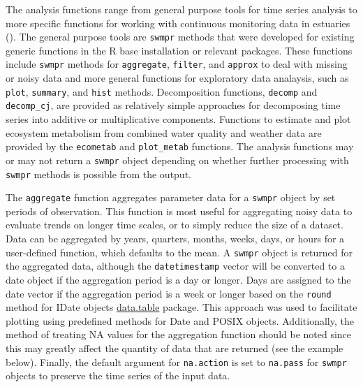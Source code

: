 \documentclass[10pt,letterpaper]{article}\usepackage[]{graphicx}\usepackage[]{color}
\begin{document}
The analysis functions range from general purpose tools for time series analysis to more specific functions for working with continuous monitoring data in estuaries ().  The general purpose tools are \texttt{swmpr} methods that were developed for existing generic functions in the R base installation or relevant packages.  These functions include \texttt{swmpr} methods for \texttt{aggregate}, \texttt{filter}, and \texttt{approx} to deal with missing or noisy data and more general functions for exploratory data analaysis, such as \texttt{plot}, \texttt{summary}, and \texttt{hist} methods.  Decomposition functions, \texttt{decomp} and \texttt{decomp\_cj}, are provided as relatively simple approaches for decomposing time series into additive or multiplicative components. Functions to estimate and plot ecosystem metabolism from combined water quality and weather data are provided by the \texttt{ecometab} and \texttt{plot\_metab} functions.  The analysis functions may or may not return a \texttt{swmpr} object depending on whether further processing with \texttt{swmpr} methods is possible from the output.    

The \texttt{aggregate} function aggregates parameter data for a \texttt{swmpr} object by set periods of observation.  This function is most useful for aggregating noisy data to evaluate trends on longer time scales, or to simply reduce the size of a dataset.  Data can be aggregated by years, quarters, months, weeks, days, or hours for a user-defined function, which defaults to the mean.  A \texttt{swmpr} object is returned for the aggregated data, although the \texttt{datetimestamp} vector will be converted to a date object if the aggregation period is a day or longer.  Days are assigned to the date vector if the aggregation period is a week or longer based on the \texttt{round} method for IDate objects \href{http://cran.r-project.org/web/packages/data.table/index.html}{data.table} package.  This approach was used to facilitate plotting using predefined methods for Date and POSIX objects.  Additionally, the method of treating NA values for the aggregation function should be noted since this may greatly affect the quantity of data that are returned (see the example below).  Finally, the default argument for \texttt{na.action} is set to \texttt{na.pass} for \texttt{swmpr} objects to preserve the time series of the input data.
\end{document}
